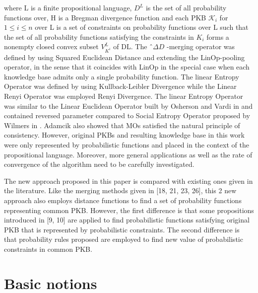 \documentclass[]{iosart2c}
\begin{document}
  where L is a finite propositional language, $D^L$ is the set of all probability functions over, H is a Bregman divergence function and each PKB $\mathcal{K}_i$ for $1 \le i \le n$ over L is a set of constraints on probability functions over L such that the set of all probability functions satisfying the constraints in $K_i$ forms a nonempty closed convex subset $V^L_{K^i}$ of DL. The ˆ$\Delta D$ -merging operator was defined by using Squared Euclidean Distance and extending the LinOp-pooling operator, in the sense that it coincides with LinOp in the special case when each knowledge base admits only a single probability function. The linear Entropy Operator was defined by using Kullback-Leibler Divergence while the Linear Renyi Operator was employed Renyi Divergence. The linear Entropy Operator was similar to the Linear Euclidean Operator built by Osherson and Vardi in \cite{26} and contained reversed parameter compared to Social Entropy Operator proposed by Wilmers in \cite{21}. Adamcik also showed that MOs satisfied the natural principle of consistency. However, original PKBs and resulting knowledge base in this work were only represented by probabilistic functions and placed in the context of the propositional language. Moreover, more general applications as well as the rate of convergence of the algorithm need to be carefully investigated.

  The new approach proposed in this paper is compared with existing ones given in the literature. Like the merging methods given in [18, 21, 23, 26], this 2 new approach also employs distance functions to find a set of probability functions representing common PKB. However, the first difference is that some propositions introduced in [9, 10] are applied to find probabilistic functions satisfying original PKB that is represented by probabilistic constraints. The second difference is that probability rules proposed \cite{27} are employed to find new value of probabilistic constraints in common PKB.


  \section{Basic notions}
\end{document}
